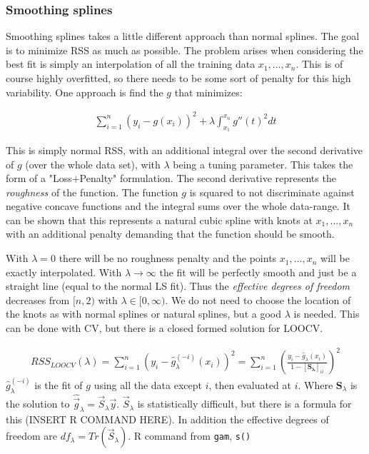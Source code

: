 \documentclass{article}
\renewcommand{\vec}[1]{\mathbf{#1}} %
\begin{document}
\subsubsection{Smoothing splines}
Smoothing splines takes a little different approach than normal splines. The goal is to minimize RSS as much as possible. The problem arises when considering the best fit is simply an interpolation of all the training data $x_1, ... , x_n$. This is of course highly overfitted, so there needs to be some sort of penalty for this high variability. One approach is find the $g$ that minimizes: 

\begin{align*}
    \sum_{i=1}^{n} (y_i-g(x_i))^2 + \lambda \int_{x_1}^{x_n} g''(t)^2 dt
\end{align*}

This is simply normal RSS, with an additional integral over the second derivative of $g$ (over the whole data set), with $\lambda$ being a tuning parameter. This takes the form of a "Loss+Penalty" formulation. The second derivative represents the \textit{roughness} of the function. The function $g$ is squared to not discriminate against negative concave functions and the integral sums over the whole data-range. It can be shown that this represents a natural cubic spline with knots at $x_1, ... , x_n$ with an additional penalty demanding that the function should be smooth.   

With $\lambda = 0$ there will be no roughness penalty and the points $x_1, ... , x_n$ will be exactly interpolated. With $\lambda \rightarrow \infty$ the fit will be perfectly smooth and just be a straight line (equal to the normal LS fit). Thus the \textit{effective degrees of freedom} decreases from $[n,2)$ with $\lambda \in [0, \infty)$. We do not need to choose the location of the knots as with normal splines or natural splines, but a good $\lambda$ is needed. This can be done with CV, but there is a closed formed solution for LOOCV.

\begin{align*}
    RSS_{LOOCV}(\lambda) = \sum_{i=1}^n \left( y_i - \hat{g}_\lambda^{(-i)} (x_i)\right)^2 = \sum_{i=1}^n \left( \frac{y_i - \hat{g}_\lambda (x_i)}{1-[\vec{S_\lambda}]_{ii} } \right)^2
\end{align*}
$\hat{g}_\lambda^{(-i)}$ is the fit of $g$ using all the data except $i$, then evaluated at $i$. Where $\vec{S}_\lambda$ is the solution to $\hat{\Vec{g}}_\lambda = \Vec{S}_\lambda \Vec{y}$. $\Vec{S}_\lambda$ is statistically difficult, but there is a formula for this (INSERT R COMMAND HERE). In addition the effective degrees of freedom are $df_\lambda = Tr(\Vec{S}_\lambda)$.  R command from \texttt{gam}, \texttt{s()}
\end{document}
